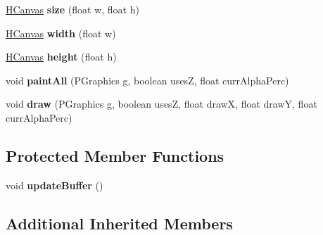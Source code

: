 \begin{DoxyCompactItemize}
\item 
\hypertarget{classhype_1_1drawable_1_1_h_canvas_aa23f93ad22eb3aea5810fc337411d310}{\hyperlink{classhype_1_1drawable_1_1_h_canvas}{H\-Canvas} {\bfseries size} (float w, float h)}\label{classhype_1_1drawable_1_1_h_canvas_aa23f93ad22eb3aea5810fc337411d310}

\item 
\hypertarget{classhype_1_1drawable_1_1_h_canvas_a3d44daed96f1b010848c73ee31f3a103}{\hyperlink{classhype_1_1drawable_1_1_h_canvas}{H\-Canvas} {\bfseries width} (float w)}\label{classhype_1_1drawable_1_1_h_canvas_a3d44daed96f1b010848c73ee31f3a103}

\item 
\hypertarget{classhype_1_1drawable_1_1_h_canvas_a5782a46d0b847bdd03f13034bddbcfbc}{\hyperlink{classhype_1_1drawable_1_1_h_canvas}{H\-Canvas} {\bfseries height} (float h)}\label{classhype_1_1drawable_1_1_h_canvas_a5782a46d0b847bdd03f13034bddbcfbc}

\item 
\hypertarget{classhype_1_1drawable_1_1_h_canvas_ab9c4170736dfd90149b29acd671ffd76}{void {\bfseries paint\-All} (P\-Graphics g, boolean uses\-Z, float curr\-Alpha\-Perc)}\label{classhype_1_1drawable_1_1_h_canvas_ab9c4170736dfd90149b29acd671ffd76}

\item 
\hypertarget{classhype_1_1drawable_1_1_h_canvas_a1a0c59344a132623f8c6e999b2cf232a}{void {\bfseries draw} (P\-Graphics g, boolean uses\-Z, float draw\-X, float draw\-Y, float curr\-Alpha\-Perc)}\label{classhype_1_1drawable_1_1_h_canvas_a1a0c59344a132623f8c6e999b2cf232a}

\end{DoxyCompactItemize}
\subsection*{Protected Member Functions}
\begin{DoxyCompactItemize}
\item 
\hypertarget{classhype_1_1drawable_1_1_h_canvas_af03fa8512ff9955433a25e265929f6ae}{void {\bfseries update\-Buffer} ()}\label{classhype_1_1drawable_1_1_h_canvas_af03fa8512ff9955433a25e265929f6ae}

\end{DoxyCompactItemize}
\subsection*{Additional Inherited Members}


